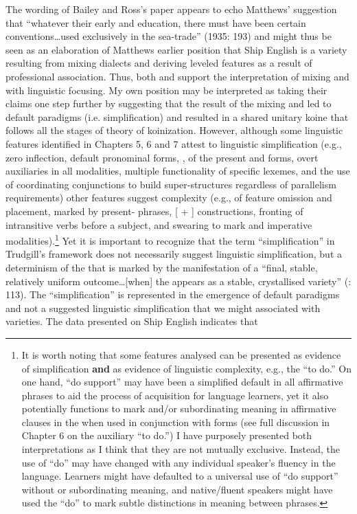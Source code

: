 The wording of Bailey and Ross’s paper appears to echo Matthews’ suggestion that “whatever their early  and education, there must have been certain conventions…used exclusively in the sea-trade” (1935: 193) and might thus be seen as an elaboration of Matthews earlier position that Ship English is a variety resulting from mixing dialects and deriving leveled features as a result of professional association. Thus, both  and \citet{BaileyRoss1988} support the interpretation of mixing and  with linguistic focusing. My own position may be interpreted as taking their claims one step further by suggesting that the result of the mixing and  led to default paradigms (i.e. simplification) and resulted in a shared unitary koine that follows all the stages of  theory of koinization. However, although some linguistic features identified in Chapters 5, 6 and 7 attest to linguistic simplification (e.g., zero inflection, default pronominal forms, ,  of the present and   forms, overt auxiliaries in all modalities, multiple functionality of specific lexemes, and the use of coordinating conjunctions to build super-structures regardless of parallelism requirements) other features suggest complexity (e.g.,  of feature omission and placement,  marked by present- phrases, [ + ] constructions, fronting of intransitive verbs before a  subject, and swearing to mark  and imperative modalities).\footnote{It is worth noting that some features analysed can be presented as evidence of simplification \textbf{and} as evidence of linguistic complexity, e.g., the  “to do.” On one hand, “do support” may have been a simplified default in all affirmative  phrases to aid the process of acquisition for language learners, yet it also potentially functions to mark  and/or subordinating meaning in affirmative clauses in the  when used in conjunction with  forms (see full discussion in Chapter 6 on the auxiliary “to do.”) I have purposely presented both interpretations as I think that they are not mutually exclusive. Instead, the use of “do” may have changed with any individual speaker’s fluency in the language. Learners might have defaulted to a universal use of “do support” without  or subordinating meaning, and native/fluent speakers might have used the  “do” to mark subtle distinctions in meaning between  phrases.  } Yet it is important to recognize that the term “simplification” in Trudgill’s framework does not necessarily suggest linguistic simplification, but a determinism of the  that is marked by the manifestation of a “final, stable, relatively uniform outcome…[when] the  appears as a stable, crystallised variety” (\citealt{Trudgill2004}: 113). The “simplification” is represented in the emergence of default paradigms and not a suggested linguistic simplification that we might associated with  varieties. The data presented on Ship English indicates that 